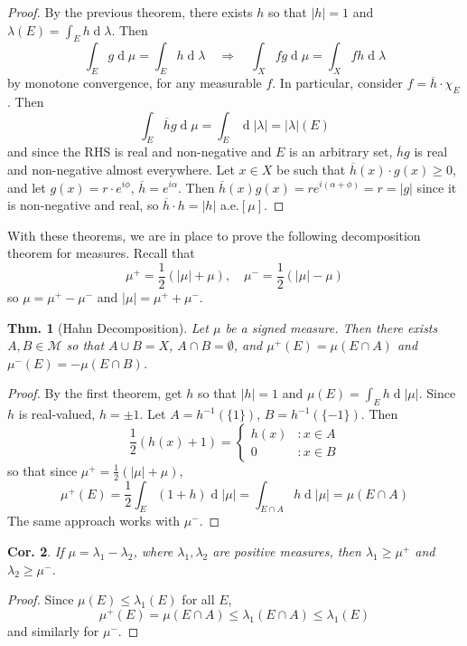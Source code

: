 \documentclass[12pt, a4paper]{book}
\renewcommand{\d}[1]{\ensuremath{\operatorname{d}\!{#1}}} %
\newcommand{\imp}{\ensuremath{\quad\Longrightarrow\quad}}
\newtheorem{theorem}{Thm.}[section]
\newtheorem{corollary}[theorem]{Cor.}
\theoremstyle{nonumberplain}
\newtheorem{proof}{Proof}
\begin{document}
\begin{proof}
    By the previous theorem, there exists $h$ so that $|h|=1$ and $\lambda(E)=\int_Eh\d{\lambda}$.
    Then
    \[\int_E g\d{\mu}=\int_E h\d{\lambda}\imp \int_X fg\d{\mu}=\int_X fh\d{\lambda}\]
    by monotone convergence, for any measurable $f$.
    In particular, consider $f=\overline{h}\cdot \chi_E$.
    Then
    \[\int_E\overline{h}g\d{\mu}=\int_E\d{|\lambda|}=|\lambda|(E)\]
    and since the RHS is real and non-negative and $E$ is an arbitrary set, $\overline{h}g$ is real and non-negative almost everywhere.
    Let $x\in X$ be such that $\overline{h}(x)\cdot g(x)\geq 0$, and let $g(x)=r\cdot e^{i\phi}$, $\overline{h}=e^{i\alpha}$.
    Then $\overline{h}(x)g(x)=re^{i(\alpha+\phi)}=r=|g|$ since it is non-negative and real, so $\overline{h}\cdot h=|h|$ a.e.$[\mu]$.
\end{proof}
With these theorems, we are in place to prove the following decomposition theorem for measures.
Recall that
\[\mu^+=\frac{1}{2}(|\mu|+\mu),\quad\mu^-=\frac{1}{2}(|\mu|-\mu)\]
so $\mu=\mu^+-\mu^-$ and $|\mu|=\mu^++\mu^-$.
\begin{theorem}[Hahn Decomposition]
    Let $\mu$ be a signed measure.
    Then there exists $A,B\in\mathcal{M}$ so that $A\cup B=X$, $A\cap B=\emptyset$, and $\mu^+(E)=\mu(E\cap A)$ and $\mu^-(E)=-\mu(E\cap B)$.
\end{theorem}
\begin{proof}
    By the first theorem, get $h$ so that $|h|=1$ and $\mu(E)=\int_E h\d{|\mu|}$.
    Since $h$ is real-valued, $h=\pm 1$.
    Let $A=h^{-1}(\{1\})$, $B=h^{-1}(\{-1\})$.
    Then
    \[\frac{1}{2}(h(x)+1)=
        \begin{cases}
            h(x) &: x\in A\\
            0 &: x\in B
        \end{cases}
    \]
    so that since $\mu^+=\frac{1}{2}(|\mu|+\mu)$,
    \[\mu^+(E)=\frac{1}{2}\int_E(1+h)\d{|\mu|}=\int_{E\cap A} h\d{|\mu|}=\mu(E\cap A)\]
    The same approach works with $\mu^-$.
\end{proof}
\begin{corollary}
    If $\mu=\lambda_1-\lambda_2$, where $\lambda_1,\lambda_2$ are positive measures, then $\lambda_1\geq\mu^+$ and $\lambda_2\geq\mu^-$.
\end{corollary}
\begin{proof}
    Since $\mu(E)\leq\lambda_1(E)$ for all $E$,
    \begin{equation*}\mu^+(E)=\mu(E\cap A)\leq\lambda_1(E\cap A)\leq\lambda_1(E)\end{equation*}
    and similarly for $\mu^-$.
\end{proof}
\end{document}
